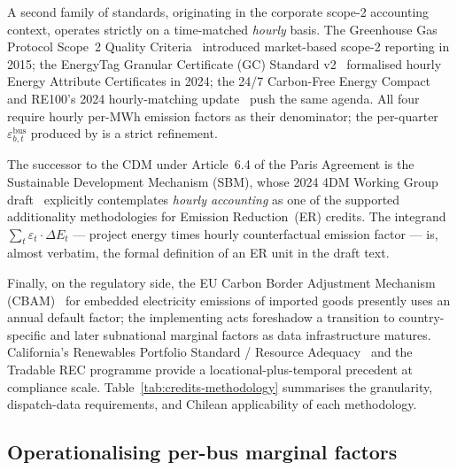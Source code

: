 A second family of standards, originating in the corporate scope-2
accounting context, operates strictly on a time-matched
\textit{hourly} basis.  The Greenhouse Gas Protocol Scope~2 Quality
Criteria~\cite{GHGScope2} introduced market-based scope-2 reporting in
2015; the EnergyTag Granular Certificate (GC) Standard
v2~\cite{EnergyTagGC} formalised hourly Energy Attribute Certificates
in 2024; the 24/7 Carbon-Free Energy Compact~\cite{CFE247} and
RE100's 2024 hourly-matching update~\cite{RE100Hourly} push the same
agenda.  All four require hourly per-MWh emission factors as their
denominator; the per-quarter $\varepsilon^{\mathrm{bus}}_{b,t}$
produced by \cenpipe{} is a strict refinement.

The successor to the CDM under Article~6.4 of the Paris Agreement is
the Sustainable Development Mechanism (SBM), whose 2024 4DM Working
Group draft~\cite{Article64Draft} explicitly contemplates
\emph{hourly accounting} as one of the supported additionality
methodologies for Emission Reduction~(ER) credits.  The integrand
$\sum_t \varepsilon_t \cdot \Delta E_t$ — project energy times
hourly counterfactual emission factor — is, almost verbatim, the
formal definition of an ER unit in the draft text.

Finally, on the regulatory side, the EU Carbon Border Adjustment
Mechanism (CBAM)~\cite{CBAM2023} for embedded electricity emissions
of imported goods presently uses an annual default factor; the
implementing acts foreshadow a transition to country-specific and
later subnational marginal factors as data infrastructure matures.
California's Renewables Portfolio Standard / Resource
Adequacy~\cite{CARPSRA} and the Tradable REC programme provide a
locational-plus-temporal precedent at compliance scale.
Table~\ref{tab:credits-methodology} summarises the granularity,
dispatch-data requirements, and Chilean applicability of each
methodology.

\begin{table}[t]
\centering
\caption{Carbon-credit methodologies and their granularity in space,
time, and dispatch-data requirements.  ``A'' annual, ``M'' monthly,
``H'' hourly, ``Q'' quarter-hourly.  ``Loc.''~indicates whether the
methodology supports per-bus differentiation.}
\label{tab:credits-methodology}

\end{table}

\subsection{Operationalising per-bus marginal factors}
\label{sec:credits-ops}

